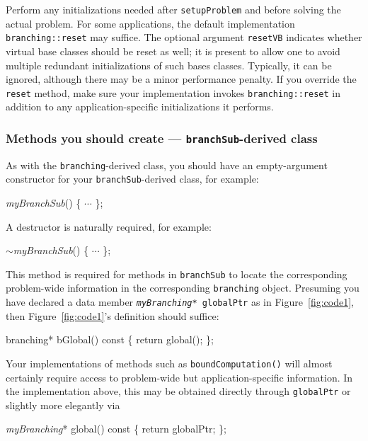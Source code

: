  Perform any initializations
needed after \texttt{setupProblem} and before solving the actual
problem.  For some applications, the default implementation
\texttt{branching::reset} may suffice.  The optional argument
\texttt{resetVB} indicates whether virtual base classes should be
reset as well; it is present to allow one to avoid multiple redundant
initializations of such bases classes.  Typically, it can be ignored,
although there may be a minor performance penalty.  If you override the
\texttt{reset} method, make sure your implementation invokes
\texttt{branching::reset} in addition to any application-specific
initializations it performs.

\subsubsection{Methods you should create ---
  \texttt{branchSub}-derived class}
\label{sec:bsubmethods}

As with the \texttt{branching}-derived class,
you should have an empty-argument constructor for your
\texttt{branchSub}-derived class, for example:
\begin{codeblock}
\emph{myBranchSub}() \{  $\cdots$ \}; \\
\end{codeblock}

A destructor is naturally required, for example:
\begin{codeblock}
$\sim$\emph{myBranchSub}() \{ $\cdots$ \}; \\
\end{codeblock}

This method is required for methods in \texttt{branchSub} to locate
the corresponding problem-wide information in the corresponding
\texttt{branching} object.  Presuming you have declared a data member
\texttt{\emph{myBranching}* globalPtr} as in Figure~\ref{fig:code1}, 
then Figure~\ref{fig:code1}'s definition should suffice:
\begin{codeblock}
branching* bGlobal() const \{ return global(); \};
\end{codeblock}
Your implementations of methods such as \texttt{boundComputation()}
will almost certainly require access to problem-wide but
application-specific information.  In the implementation above, this
may be obtained directly through \texttt{globalPtr} or slightly more
elegantly via
\begin{codeblock}
\emph{myBranching}* global() const \{ return globalPtr; \};
\end{codeblock}

